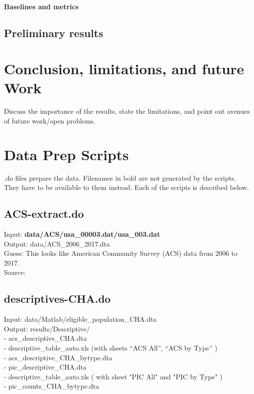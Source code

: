 \documentclass[11pt]{article}
\begin{document}
\paragraph{Baselines and metrics}



\subsection{Preliminary results}


\section{Conclusion, limitations, and future Work}
Discuss the importance of the results, state the limitations, and point out avenues of future work/open problems.
\newpage
\section{Data Prep Scripts}
.do files prepare the data. Filenames in bold are not generated by the scripts. They have to be available to them instead. Each of the scripts is described below.

\subsection{ACS-extract.do}
Input: \textbf{data/ACS/usa\_00003.dat/usa\_003.dat} \\
Output: data/ACS\_2006\_2017.dta \\
Guess: This looks like American Community Survey (ACS) data from 2006 to 2017. \\
Source: 

\subsection{descriptives-CHA.do}
Input: data/Matlab/eligible\_population\_CHA.dta \\
Output:  results/Descriptive/ \\
- acs\_descriptive\_CHA.dta \\
- descriptive\_table\_auto.xls  (with sheets “ACS All”, “ACS by Type” )\\
		- acs\_descriptive\_CHA\_bytype.dta\\
		- pic\_descriptive\_CHA.dta\\
		- descriptive\_table\_auto.xls ( with sheet "PIC All" and "PIC by Type" )\\
		- pic\_counts\_CHA\_bytype.dta\\
\end{document}

